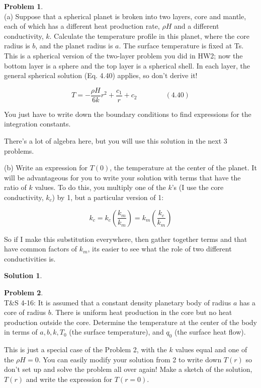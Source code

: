 \documentclass[titlepage, 11pt]{article}
\theoremstyle{definition}
\newtheorem{problem}{Problem}
\newtheorem*{solution}{Solution}
\begin{document}
\begin{problem}\ \\
(a) Suppose that a spherical planet is broken into two layers, core and mantle, each of which has a different heat production rate, $\rho H$ and a different conductivity, $k$. Calculate the temperature profile in this planet, where the core radius is $b$, and the planet radius is $a$. The surface temperature is fixed at Ts. This is a spherical version of the two-layer problem you did in HW2; now the bottom layer is a sphere and the top layer is a spherical shell. In each layer, the general spherical solution (Eq. 4.40) applies, so don’t derive it!

$$T = - \frac{\rho H}{6k}{r}^{2} + \frac{c_1}{r} + c_{2} \qquad \qquad (4.40)$$

\noindent
You just have to write down the boundary conditions to find expressions for the integration constants.\vspace{\baselineskip}

\noindent
There’s a lot of algebra here, but you will use this solution in the next 3 problems.\vspace{\baselineskip}

\noindent
(b) Write an expression for $T(0)$, the temperature at the center of the planet. It will be advantageous for you to write your solution with terms that have the ratio of $k$ values. To do this, you multiply one of the $k$’s (I use the core conductivity, $k_c$) by 1, but a particular version of 1:

$$k_{c} = k_{c} \left(\frac{k_{m}}{k_{m}}\right) = k_{m}\left(\frac{k_{c}}{k_{m}}\right)$$

\noindent
So if I make this substitution everywhere, then gather together terms and that have common factors of $k_{m}$, its easier to see what the role of two different conductivities is. 
\end{problem}

\begin{solution}

\end{solution}

\newpage

\begin{problem}\ \\
T\&S 4-16: It is assumed that a constant density planetary body of radius $a$ has a core of radius $b$. There is uniform heat production in the core but no heat production outside the core. Determine the temperature at the center of the body in terms of $a, b, k, T_0$ (the surface temperature), and $q_0$ (the surface heat flow).\vspace{\baselineskip}

\noindent
This is just a special case of the Problem 2, with the $k$ values equal and one of the $\rho H = 0$. You can easily modify your solution from 2 to write down $T(r)$ so don't set up and solve the problem all over again! Make a sketch of the solution, $T(r)$ and write the expression for $T(r=0)$.
\end{problem}
\end{document}
